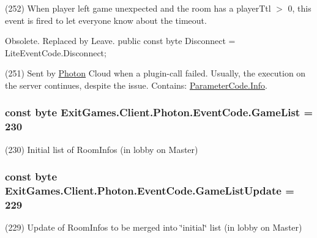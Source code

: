 (252) When player left game unexpected and the room has a player\+Ttl $>$ 0, this event is fired to let everyone know about the timeout. 

Obsolete. Replaced by Leave. public const byte Disconnect = Lite\+Event\+Code.\+Disconnect; 

(251) Sent by \hyperlink{namespace_exit_games_1_1_client_1_1_photon}{Photon} Cloud when a plugin-\/call failed. Usually, the execution on the server continues, despite the issue. Contains\+: \hyperlink{class_exit_games_1_1_client_1_1_photon_1_1_parameter_code_ad7faa8ed1297c1ca6954f85cff1e7da2}{Parameter\+Code.\+Info}.
\subsubsection[{\texorpdfstring{Game\+List}{GameList}}]{\setlength{\rightskip}{0pt plus 5cm}const byte Exit\+Games.\+Client.\+Photon.\+Event\+Code.\+Game\+List = 230}\hypertarget{class_exit_games_1_1_client_1_1_photon_1_1_event_code_a76ee5ffbffe8b7deeb9592635b3e2ea8}{}\label{class_exit_games_1_1_client_1_1_photon_1_1_event_code_a76ee5ffbffe8b7deeb9592635b3e2ea8}


(230) Initial list of Room\+Infos (in lobby on Master)

\subsubsection[{\texorpdfstring{Game\+List\+Update}{GameListUpdate}}]{\setlength{\rightskip}{0pt plus 5cm}const byte Exit\+Games.\+Client.\+Photon.\+Event\+Code.\+Game\+List\+Update = 229}\hypertarget{class_exit_games_1_1_client_1_1_photon_1_1_event_code_a188e6424527bad132c9d5b0bfc4e5e4d}{}\label{class_exit_games_1_1_client_1_1_photon_1_1_event_code_a188e6424527bad132c9d5b0bfc4e5e4d}


(229) Update of Room\+Infos to be merged into \char`\"{}initial\char`\"{} list (in lobby on Master)

